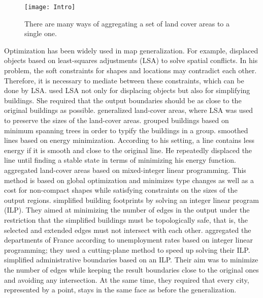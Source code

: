 
\begin{figure}[tb]
\centering
\texttt{[image: Intro]}
\caption{There are many ways of aggregating a set of land 
cover areas to a single one.}
\label{fig:Intro_SubdivisionName}
\end{figure}

Optimization has been widely used in map generalization.
For example, \textcite{Harrie1999} displaced objects 
based on least-squares adjustments (LSA)
to solve spatial conflicts.
In his problem, the soft constraints 
for shapes and locations may contradict each other.
Therefore, it is necessary 
to mediate between these constraints, 
which can be done by LSA.
\textcite{Sester2005Optimization} used LSA not only for 
displacing objects but also for simplifying buildings. 
She required that 
the output boundaries should be 
as close to the original buildings as possible.
\textcite{Tong2015AreaLSA} generalized land-cover areas,
where LSA was used to preserve the sizes of 
the land-cover areas.
\textcite{Regnauld2001} grouped buildings based on 
minimum spanning trees in order to typify
the buildings in a group.
\textcite{Burghardt2005Snakes} smoothed lines based on 
energy minimization. 
According to his setting, a line contains less energy
if it is smooth and close to the original line.
He repeatedly displaced the line 
until finding a stable state 
in terms of minimizing his energy function.
\textcite{HaunertWolff2010AreaAgg} aggregated land-cover areas
based on mixed-integer linear programming.
This method is based on global optimization and minimizes 
type changes as well as a cost for non-compact shapes 
while satisfying constraints on the sizes of the output regions.
\textcite{Haunertwolff2010Building} simplified building
footprints by solving an integer linear program (ILP).
They aimed at minimizing the number of edges in the output 
under the restriction that 
the simplified buildings must be topologically safe,
that is, the selected and extended edges must not intersect with 
each other.
\textcite{Oehrlein2017Aggregation} aggregated the departments 
of France according to unemployment rates based on integer 
linear programming; they used a cutting-plane method to 
speed up solving their ILP.
\textcite{Funke2017Simplification} simplified 
administrative boundaries based on an ILP.
Their aim was to minimize the number of edges
while keeping the result boundaries close to the original ones
and avoiding any intersection. 
At the same time, they required that every city, 
represented by a point, 
stays in the same face as before the generalization.



